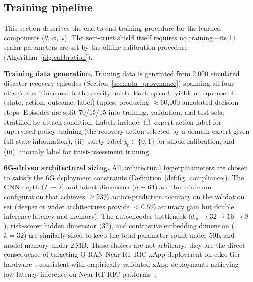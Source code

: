 \documentclass[10pt,journal,compsoc]{IEEEtran}
\begin{document}
\subsection{Training pipeline}
\label{sec:training_pipeline}

This section describes the end-to-end training procedure for the learned components ($\theta$, $\phi$, $\omega$).
The zero-trust shield itself requires no training---its 14 scalar parameters are set by the offline calibration procedure (Algorithm~\ref{alg:calibration}).

\noindent\textbf{Training data generation.}
Training data is generated from 2,000 simulated disaster-recovery episodes (Section~\ref{sec:data_provenance}) spanning all four attack conditions and both severity levels.
Each episode yields a sequence of (state, action, outcome, label) tuples, producing $\approx$60,000 annotated decision steps.
Episodes are split 70/15/15 into training, validation, and test sets, stratified by attack condition.
Labels include: (i)~expert action label for supervised policy training (the recovery action selected by a domain expert given full state information), (ii)~safety label $y_t \in \{0, 1\}$ for shield calibration, and (iii)~anomaly label for trust-assessment training.

\noindent\textbf{6G-driven architectural sizing.}
All architectural hyperparameters are chosen to satisfy the 6G deployment constraints (Definition~\ref{def:6g_compliance}).
The GNN depth ($L=2$) and latent dimension ($d=64$) are the minimum configuration that achieves $\ge 93\%$ action-prediction accuracy on the validation set (deeper or wider architectures provide $<0.5\%$ accuracy gain but double inference latency and memory).
The autoencoder bottleneck ($d_{\mathrm{in}} \to 32 \to 16 \to 8$), risk-scorer hidden dimension (32), and contrastive embedding dimension ($k=32$) are similarly sized to keep the total parameter count under 50K and model memory under 2\,MB.
These choices are not arbitrary: they are the direct consequence of targeting O-RAN Near-RT RIC xApp deployment on edge-tier hardware~\cite{oran_official_architecture,oran_ngrg_2024}, consistent with empirically validated xApp deployments achieving low-latency inference on Near-RT RIC platforms~\cite{dasilva2024xapp,raftopoulos2024drl}.
\end{document}
